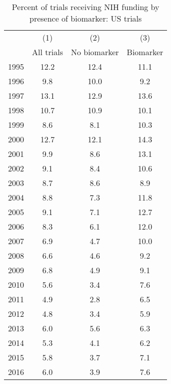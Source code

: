 \begin{table}[htbp]\centering
\caption{Percent of trials receiving NIH funding by presence of biomarker: US trials}
\begin{tabular}{l*{3}{c}}
\hline\hline
                    &\multicolumn{1}{c}{(1)}&\multicolumn{1}{c}{(2)}&\multicolumn{1}{c}{(3)}\\
                    &\multicolumn{1}{c}{All trials}&\multicolumn{1}{c}{No biomarker}&\multicolumn{1}{c}{Biomarker}\\
\hline
1995                &        12.2&        12.4&        11.1\\
1996                &         9.8&        10.0&         9.2\\
1997                &        13.1&        12.9&        13.6\\
1998                &        10.7&        10.9&        10.1\\
1999                &         8.6&         8.1&        10.3\\
2000                &        12.7&        12.1&        14.3\\
2001                &         9.9&         8.6&        13.1\\
2002                &         9.1&         8.4&        10.6\\
2003                &         8.7&         8.6&         8.9\\
2004                &         8.8&         7.3&        11.8\\
2005                &         9.1&         7.1&        12.7\\
2006                &         8.3&         6.1&        12.0\\
2007                &         6.9&         4.7&        10.0\\
2008                &         6.6&         4.6&         9.2\\
2009                &         6.8&         4.9&         9.1\\
2010                &         5.6&         3.4&         7.6\\
2011                &         4.9&         2.8&         6.5\\
2012                &         4.8&         3.4&         5.9\\
2013                &         6.0&         5.6&         6.3\\
2014                &         5.3&         4.1&         6.2\\
2015                &         5.8&         3.7&         7.1\\
2016                &         6.0&         3.9&         7.6\\
\hline\hline
\end{tabular}
\end{table}
